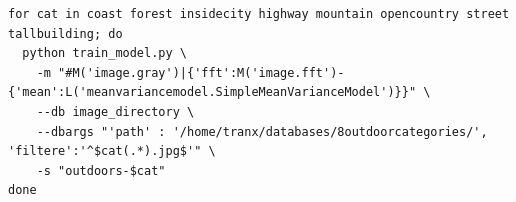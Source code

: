 \documentclass{report}
\begin{document}
\begin{lstlisting}
for cat in coast forest insidecity highway mountain opencountry street tallbuilding; do
  python train_model.py \
    -m "#M('image.gray')|{'fft':M('image.fft')-{'mean':L('meanvariancemodel.SimpleMeanVarianceModel')}}" \
    --db image_directory \
    --dbargs "'path' : '/home/tranx/databases/8outdoorcategories/', 'filtere':'^$cat(.*).jpg$'" \
    -s "outdoors-$cat" 
done

\end{lstlisting}
\end{document}
